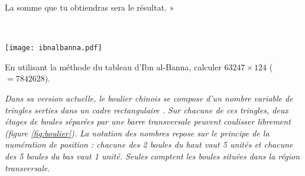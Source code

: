 \begin{td}
\begin{minipage}{15cm}
La somme que tu obtiendras sera le r\'esultat. »
\end{minipage}
\hfill
\begin{minipage}{8cm}
\begin{fig}\label{fig:ibnalbanna}
\mbox{}\\
\centerline{\texttt{[image: ibnalbanna.pdf]}}
\end{fig}
\end{minipage}

En utilisant la m\'ethode du tableau d'Ibn al-Banna, calculer $63247\times124$ 
($= 7842628$).
\end{td}

\begin{td}\label{td:boulier}
\em
Dans sa version actuelle, le boulier chinois se compose d'un nombre variable de tringles
serties dans un cadre rectangulaire \cite{chabert}. Sur chacune de ces tringles, deux étages de boules
séparées par une barre transversale peuvent coulisser librement (figure \ref{fig:boulier}).
La notation des nombres repose sur le principe de la numération de position : chacune
des 2 boules du haut vaut 5 unités et chacune des 5 boules du bas vaut 1 unité. Seules
comptent les boules situées dans la région transversale.



\end{td}
